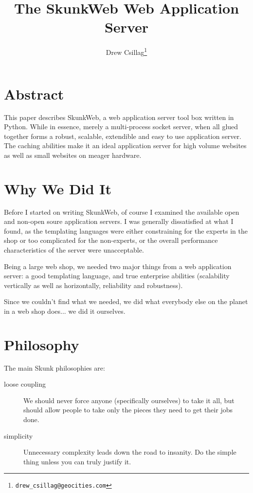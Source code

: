 \documentclass[twocolumn]{article}
\author{Drew Csillag\thanks{\texttt{drew_csillag@geocities.com}}}
\title{The SkunkWeb Web Application Server}
\begin{document}
\maketitle


\section*{Abstract}
This paper describes SkunkWeb, a web application server tool box
written in Python\cite{python}.  While in essence, merely a
multi-process socket server, when all glued together forms a robust,
scalable, extendible and easy to use application server.  The caching
abilities make it an ideal application server for high volume websites
as well as small websites on meager hardware.

\section{Why We Did It}
Before I started on writing SkunkWeb, of course I examined the
available open and non-open soure application servers.  I was
generally dissatisfied at what I found, as the templating languages
were either constraining for the experts in the shop or too
complicated for the non-experts, or the overall performance
characteristics of the server were unacceptable.


Being a large web shop, we needed two major things from a web
application server: a good templating language, and true enterprise
abilities (scalability vertically as well as horizontally, reliability
and robustness).

Since we couldn't find what we needed, we did what everybody else on
the planet in a web shop does... we did it ourselves.

\section{Philosophy}
The main Skunk philosophies are:
\begin{description}
\item[loose coupling] We should never force anyone (specifically
ourselves) to take it all, but should allow people to take only the
pieces they need to get their jobs done.
\item[simplicity] Unnecessary complexity leads down the road to
insanity.  Do the simple thing unless you can truly justify it.
\end{description}
\end{document}
